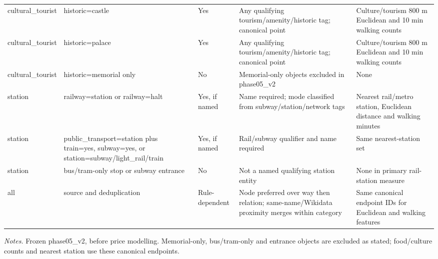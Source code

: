 \begin{landscape}
\begin{longtable}{>{\raggedright\arraybackslash}p{2.3cm}>{\raggedright\arraybackslash}p{5.1cm}>{\raggedright\arraybackslash}p{2.0cm}>{\raggedright\arraybackslash}p{6.0cm}>{\raggedright\arraybackslash}p{5.2cm}}
cultural\_\allowbreak{}tourist & historic=castle & Yes & Any qualifying tourism/amenity/historic tag; canonical point & Culture/tourism 800 m Euclidean and 10 min walking counts \\
cultural\_\allowbreak{}tourist & historic=palace & Yes & Any qualifying tourism/amenity/historic tag; canonical point & Culture/tourism 800 m Euclidean and 10 min walking counts \\
cultural\_\allowbreak{}tourist & historic=memorial only & No & Memorial-only objects excluded in phase05\_\allowbreak{}v2 & None \\
station & railway=station or railway=halt & Yes, if named & Name required; mode classified from subway/station/network tags & Nearest rail/metro station, Euclidean distance and walking minutes \\
station & public\_\allowbreak{}transport=station plus train=yes, subway=yes, or station=subway/light\_\allowbreak{}rail/train & Yes, if named & Rail/subway qualifier and name required & Same nearest-station set \\
station & bus/tram-only stop or subway entrance & No & Not a named qualifying station entity & None in primary rail-station measure \\
all & source and deduplication & Rule-dependent & Node preferred over way then relation; same-name/Wikidata proximity merges within category & Same canonical endpoint IDs for Euclidean and walking features \\
\bottomrule
\end{longtable}
{\footnotesize\noindent\emph{Notes.} Frozen phase05\_v2, before price modelling. Memorial-only, bus/tram-only and entrance objects are excluded as stated; food/culture counts and nearest station use these canonical endpoints.\par}
\end{landscape}
